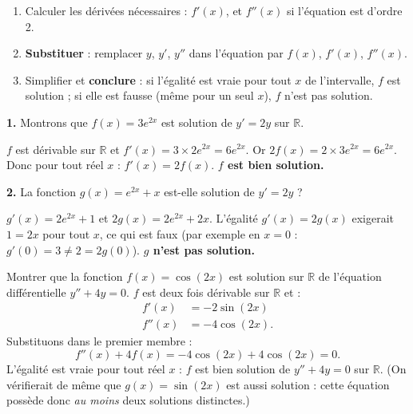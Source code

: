 \documentclass[11pt]{article}
\begin{document}
\begin{methode}
\begin{enumerate}
\item Calculer les dérivées nécessaires : $f'(x)$, et $f''(x)$ si l'équation est d'ordre 2.
\item \textbf{Substituer} : remplacer $y$, $y'$, $y''$ dans l'équation par $f(x)$, $f'(x)$, $f''(x)$.
\item Simplifier et \textbf{conclure} : si l'égalité est vraie pour tout $x$ de l'intervalle, $f$ est solution ; si elle est fausse (même pour un seul $x$), $f$ n'est pas solution.
\end{enumerate}
\end{methode}

\begin{exemplebox}
\textbf{1.} Montrons que $f(x) = 3e^{2x}$ est solution de $y' = 2y$ sur $\mathbb{R}$.

$f$ est dérivable sur $\mathbb{R}$ et $f'(x) = 3 \times 2e^{2x} = 6e^{2x}$. Or $2f(x) = 2 \times 3e^{2x} = 6e^{2x}$. Donc pour tout réel $x$ : $f'(x) = 2f(x)$. \textbf{$f$ est bien solution.}

\textbf{2.} La fonction $g(x) = e^{2x} + x$ est-elle solution de $y' = 2y$ ?

$g'(x) = 2e^{2x} + 1$ et $2g(x) = 2e^{2x} + 2x$. L'égalité $g'(x) = 2g(x)$ exigerait $1 = 2x$ pour tout $x$, ce qui est faux (par exemple en $x = 0$ : $g'(0) = 3 \neq 2 = 2g(0)$). \textbf{$g$ n'est pas solution.}
\end{exemplebox}

\begin{exoresolu}
Montrer que la fonction $f(x) = \cos(2x)$ est solution sur $\mathbb{R}$ de l'équation différentielle $y'' + 4y = 0$.
\tcblower
$f$ est deux fois dérivable sur $\mathbb{R}$ et :
\begin{align*}
f'(x) &= -2\sin(2x) \\
f''(x) &= -4\cos(2x).
\end{align*}
Substituons dans le premier membre :
\[ f''(x) + 4f(x) = -4\cos(2x) + 4\cos(2x) = 0. \]
L'égalité est vraie pour tout réel $x$ : $f$ est bien solution de $y'' + 4y = 0$ sur $\mathbb{R}$. (On vérifierait de même que $g(x) = \sin(2x)$ est aussi solution : cette équation possède donc \emph{au moins} deux solutions distinctes.)
\end{exoresolu}
\end{document}
